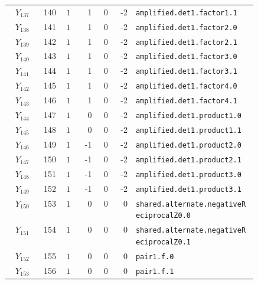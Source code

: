 {\begin{longtable}{@{}r r c r r r p{0.49\linewidth}@{}}
\(Y_{137}\) & 140 & \(1\) & 1 & 0 & -2 & \texttt{amplified.\allowbreak{}det1.\allowbreak{}factor1.\allowbreak{}1} \\
\(Y_{138}\) & 141 & \(1\) & 1 & 0 & -2 & \texttt{amplified.\allowbreak{}det1.\allowbreak{}factor2.\allowbreak{}0} \\
\(Y_{139}\) & 142 & \(1\) & 1 & 0 & -2 & \texttt{amplified.\allowbreak{}det1.\allowbreak{}factor2.\allowbreak{}1} \\
\(Y_{140}\) & 143 & \(1\) & 1 & 0 & -2 & \texttt{amplified.\allowbreak{}det1.\allowbreak{}factor3.\allowbreak{}0} \\
\(Y_{141}\) & 144 & \(1\) & 1 & 0 & -2 & \texttt{amplified.\allowbreak{}det1.\allowbreak{}factor3.\allowbreak{}1} \\
\(Y_{142}\) & 145 & \(1\) & 1 & 0 & -2 & \texttt{amplified.\allowbreak{}det1.\allowbreak{}factor4.\allowbreak{}0} \\
\(Y_{143}\) & 146 & \(1\) & 1 & 0 & -2 & \texttt{amplified.\allowbreak{}det1.\allowbreak{}factor4.\allowbreak{}1} \\
\(Y_{144}\) & 147 & \(1\) & 0 & 0 & -2 & \texttt{amplified.\allowbreak{}det1.\allowbreak{}product1.\allowbreak{}0} \\
\(Y_{145}\) & 148 & \(1\) & 0 & 0 & -2 & \texttt{amplified.\allowbreak{}det1.\allowbreak{}product1.\allowbreak{}1} \\
\(Y_{146}\) & 149 & \(1\) & -1 & 0 & -2 & \texttt{amplified.\allowbreak{}det1.\allowbreak{}product2.\allowbreak{}0} \\
\(Y_{147}\) & 150 & \(1\) & -1 & 0 & -2 & \texttt{amplified.\allowbreak{}det1.\allowbreak{}product2.\allowbreak{}1} \\
\(Y_{148}\) & 151 & \(1\) & -1 & 0 & -2 & \texttt{amplified.\allowbreak{}det1.\allowbreak{}product3.\allowbreak{}0} \\
\(Y_{149}\) & 152 & \(1\) & -1 & 0 & -2 & \texttt{amplified.\allowbreak{}det1.\allowbreak{}product3.\allowbreak{}1} \\
\(Y_{150}\) & 153 & \(1\) & 0 & 0 & 0 & \texttt{shared.\allowbreak{}alternate.\allowbreak{}negativeReciprocalZ0.\allowbreak{}0} \\
\(Y_{151}\) & 154 & \(1\) & 0 & 0 & 0 & \texttt{shared.\allowbreak{}alternate.\allowbreak{}negativeReciprocalZ0.\allowbreak{}1} \\
\(Y_{152}\) & 155 & \(1\) & 0 & 0 & 0 & \texttt{pair1.\allowbreak{}f.\allowbreak{}0} \\
\(Y_{153}\) & 156 & \(1\) & 0 & 0 & 0 & \texttt{pair1.\allowbreak{}f.\allowbreak{}1} \\

\end{longtable}}
